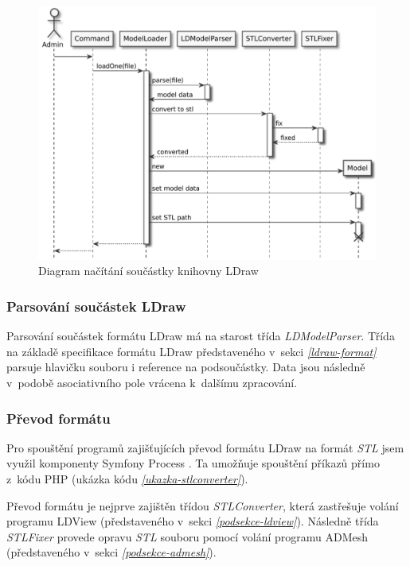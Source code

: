 \begin{figure}[htbp]
    \centering
    \includegraphics[width=\textwidth,height=\textheight,keepaspectratio]{pdfs/loading.pdf}
    \caption{Diagram načítání součástky knihovny LDraw \label{schema-nacitani}}
\end{figure}

\subsubsection*{Parsování součástek LDraw}
Parsování součástek formátu LDraw má na starost třída \textit{LDModelParser}. Třída na základě specifikace formátu LDraw představeného v~sekci \emph{\ref{ldraw-format}} parsuje hlavičku souboru i reference na podsoučástky. Data jsou následně v~podobě asociativního pole vrácena k~dalšímu zpracování.

\subsubsection*{Převod formátu}
Pro spouštění programů zajišťujících převod formátu LDraw na formát \textit{\gls{STL}} jsem využil komponenty Symfony Process \autocite{symfony:process}. Ta umožňuje spouštění příkazů přímo z~kódu PHP (ukázka kódu \emph{\ref{ukazka-stlconverter}}).

Převod formátu je nejprve zajištěn třídou \textit{STLConverter}, která zastřešuje volání programu LDView (představeného v~sekci \emph{\ref{podsekce-ldview}}). Následně třída \textit{STLFixer} provede opravu \textit{\gls{STL}} souboru pomocí volání programu ADMesh (představeného v~sekci \emph{\ref{podsekce-admesh}}).


